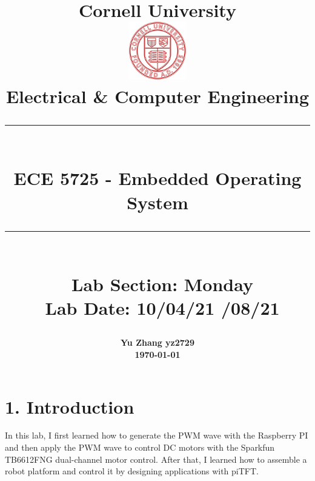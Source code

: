 \documentclass[12pt]{report}
\newcommand{\HRule}[1]{\rule{\linewidth}{#1}}
\begin{document}
\date{}

\title{ \normalsize {\textbf{Cornell University}}
		\\ [1.0cm]
		\includegraphics[width=25mm]{img/cornell_logo.png}\\[.5cm]
		Electrical & Computer Engineering \\
		\HRule{2pt} \\
		\LARGE \textbf{ ECE 5725 - Embedded Operating System} \\%
		\LARGE {}
		\HRule{2pt} \\ [0.5cm]
		\normalsize \ {Lab Section: \textbf{Monday} }\\
		\normalsize \ {Lab Date: 10/04/21 /08/21} \vspace*{5\baselineskip}\\
		}
		
\author{
		{ \textbf{Yu Zhang \quad yz2729}}\\[5cm]
		\large {\textbf{\today} } 
		}
		

\maketitle

\section*{1. Introduction\vspace{-1em}}
In this lab, I first learned how to generate the PWM wave with the Raspberry PI and then apply the PWM wave to control DC motors with the Sparkfun TB6612FNG dual-channel motor control. After that, I learned how to assemble a robot platform and control it by designing applications with piTFT.\vspace{-1em} 
\end{document}
